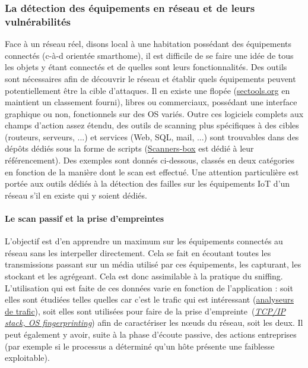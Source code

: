 \documentclass[]{article}
\begin{document}
\subsubsection{La détection des équipements en réseau et de leurs vulnérabilités}

Face à un réseau réel, disons local à une habitation possédant des équipements connectés (c-à-d orientée smarthome), il est difficile de se faire une idée de tous les objets y étant connectés et de quelles sont leurs fonctionnalités. Des outils sont nécessaires afin de découvrir le réseau et établir quels équipements peuvent potentiellement être la cible d'attaques. Il en existe une flopée (\href{https://sectools.org/}{sectools.org} en maintient un classement fourni), libres ou commerciaux, possédant une interface graphique ou non, fonctionnels sur des OS variés. Outre ces logiciels complets aux champs d'action assez étendu, des outils de scanning plus spécifiques à des cibles (routeurs, serveurs, ...) et services (Web, SQL, mail, ...) sont trouvables dans des dépôts dédiés sous la forme de scripts (\href{https://github.com/We5ter/Scanners-Box}{Scanners-box} est dédié à leur référencement). Des exemples sont donnés ci-dessous, classés en deux catégories \cite{Leos2014} en fonction de la manière dont le scan est effectué. Une attention particulière est portée aux outils dédiés à la détection des failles sur les équipements IoT d'un réseau s'il en existe qui y soient dédiés.

\paragraph{Le scan passif et la prise d'empreintes}

L'objectif est d'en apprendre un maximum sur les équipements connectés au réseau sans les interpeller directement. Cela se fait en écoutant toutes les transmissions passant sur un média utilisé par ces équipements, les capturant, les stockant et les agrégeant. Cela est donc assimilable à la pratique du sniffing. L'utilisation qui est faite de ces données varie en fonction de l'application : soit elles sont étudiées telles quelles car c'est le trafic qui est intéressant (\href{https://en.wikipedia.org/wiki/Packet_analyzer}{analyseurs de trafic}), soit elles sont utilisées pour faire de la \og prise d'empreinte\fg \ (\href{https://en.wikipedia.org/wiki/TCP/IP_stack_fingerprinting}{\textit{TCP/IP stack, OS fingerprinting}}) afin de caractériser les nœuds du réseau, soit les deux. Il peut également y avoir, suite à la phase d'écoute passive, des actions entreprises (par exemple si le processus a déterminé qu'un hôte présente une faiblesse exploitable).\\
\end{document}
